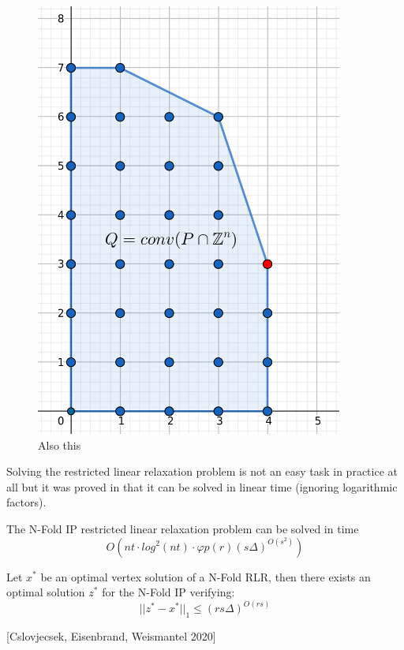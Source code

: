 \begin{figure}[h]
\begin{minipage}[b]{0.45\textwidth}
    \includegraphics[width=0.9\textwidth]{images/IP(10).png}
    \caption{Also this}
\end{minipage}
\end{figure}

Solving the restricted linear relaxation problem is not an easy task in practice at all but it was proved in \cite{EISENBRAND:2020} that it can be solved in linear time (ignoring logarithmic factors). 

\begin{proposition}
    The N-Fold IP restricted linear relaxation problem can be solved in time
    \begin{equation*}
        O(nt \cdot log^2(nt) \cdot \varphi p(r) (s\Delta)^{O(s^2)})
    \end{equation*}
\end{proposition}

\begin{proposition}
    Let $x^*$ be an optimal vertex solution of a N-Fold RLR, then there exists an optimal solution $z^*$ for the N-Fold IP verifying:  
    \begin{equation*}
        ||z^* - x^*||_1 \leq (rs\Delta)^{O(rs)}
    \end{equation*}
\end{proposition}
\hspace{15pt}[Cslovjecsek, Eisenbrand, Weismantel 2020]

